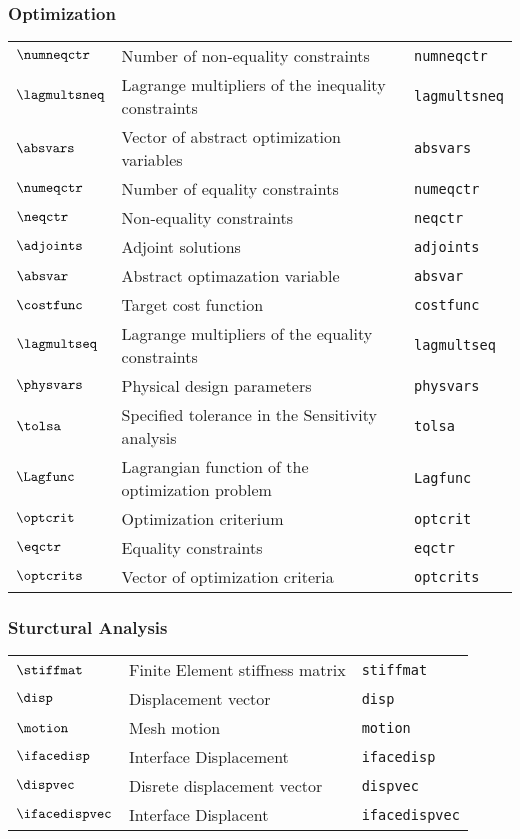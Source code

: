 \subsubsection*{Optimization}
\begin{tabular}{l l l}
$\numneqctr$ & Number of non-equality constraints& \texttt{numneqctr}\\
$\lagmultsneq$ & Lagrange multipliers of the inequality constraints& \texttt{lagmultsneq}\\
$\absvars$ & Vector of abstract optimization variables& \texttt{absvars}\\
$\numeqctr$ & Number of equality constraints& \texttt{numeqctr}\\
$\neqctr$ & Non-equality constraints& \texttt{neqctr}\\
$\adjoints$ & Adjoint solutions& \texttt{adjoints}\\
$\absvar$ & Abstract optimazation variable& \texttt{absvar}\\
$\costfunc$ & Target cost function& \texttt{costfunc}\\
$\lagmultseq$ & Lagrange multipliers of the equality constraints& \texttt{lagmultseq}\\
$\physvars$ & Physical design parameters& \texttt{physvars}\\
$\tolsa$ & Specified tolerance in the Sensitivity analysis& \texttt{tolsa}\\
$\Lagfunc$ & Lagrangian function of the optimization problem& \texttt{Lagfunc}\\
$\optcrit$ & Optimization criterium& \texttt{optcrit}\\
$\eqctr$ & Equality constraints& \texttt{eqctr}\\
$\optcrits$ & Vector of optimization criteria& \texttt{optcrits}\\
\end{tabular}

\subsubsection*{Sturctural Analysis}
\begin{tabular}{l l l}
$\stiffmat$ & Finite Element stiffness matrix& \texttt{stiffmat}\\
$\disp$ & Displacement vector& \texttt{disp}\\
$\motion$ & Mesh motion& \texttt{motion}\\
$\ifacedisp$ & Interface Displacement& \texttt{ifacedisp}\\
$\dispvec$ & Disrete displacement vector& \texttt{dispvec}\\
$\ifacedispvec$ & Interface Displacent& \texttt{ifacedispvec}\\
\end{tabular}


